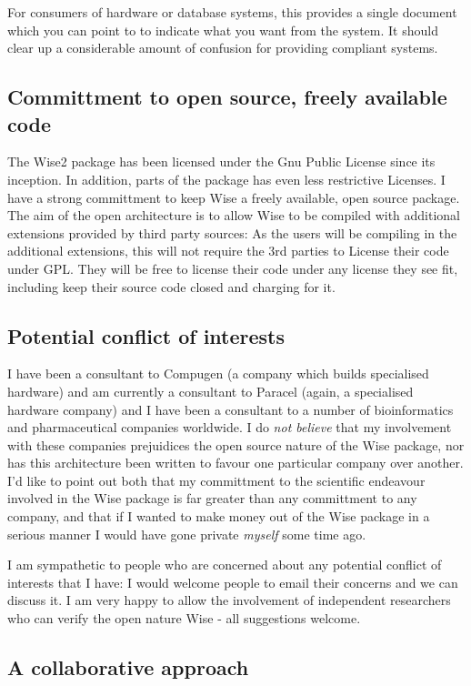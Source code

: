 For consumers of hardware or database systems, this provides a single document
which you can point to to indicate what you want from the system. It should
clear up a considerable amount of confusion for providing compliant systems.

\subsection{Committment to open source, freely available code}

The Wise2 package has been licensed under the Gnu Public License since
its inception.  In addition, parts of the package has even less
restrictive Licenses. I have a strong committment to keep Wise a
freely available, open source package. The aim of the open
architecture is to allow Wise to be compiled with additional
extensions provided by third party sources: As the users will be
compiling in the additional extensions, this will not require the 3rd
parties to License their code under GPL. They will be free to license
their code under any license they see fit, including keep their source
code closed and charging for it.

\subsection{Potential conflict of interests}

I have been a consultant to Compugen (a company which builds specialised
hardware) and am currently a consultant to Paracel (again, a specialised
hardware company) and I have been a consultant to a number of bioinformatics
and pharmaceutical companies worldwide. I do \emph{not believe} that my
involvement with these companies prejuidices the open source nature of the
Wise package, nor has this architecture been written to favour one particular
company over another. I'd like to point out both that my committment to 
the scientific endeavour involved in the Wise package is far greater than
any committment to any company, and that if I wanted to make money out
of the Wise package in a serious manner I would have gone private \emph{myself}
some time ago.

I am sympathetic to people who are concerned about any 
potential conflict of interests that I have: I would welcome people to email
their concerns and we can discuss it. I am very happy to allow the involvement
of independent researchers who can verify the open nature Wise - all suggestions
welcome.

\subsection{A collaborative approach}

